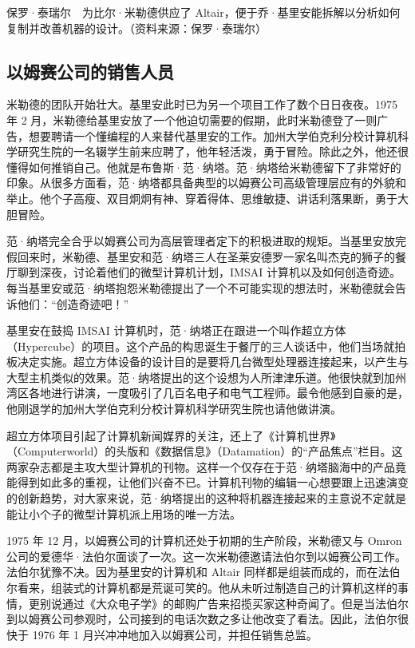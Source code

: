 \documentclass[12pt,UTF8]{ctexbook}
\begin{document}
保罗·泰瑞尔　为比尔·米勒德供应了 Altair，便于乔·基里安能拆解以分析如何复制并改善机器的设计。（资料来源：保罗·泰瑞尔）





\subsection{以姆赛公司的销售人员}


米勒德的团队开始壮大。基里安此时已为另一个项目工作了数个日日夜夜。1975 年 2 月，米勒德给基里安放了一个他迫切需要的假期，此时米勒德登了一则广告，想要聘请一个懂编程的人来替代基里安的工作。加州大学伯克利分校计算机科学研究生院的一名辍学生前来应聘了，他年轻活泼，勇于冒险。除此之外，他还很懂得如何推销自己。他就是布鲁斯·范·纳塔。范·纳塔给米勒德留下了非常好的印象。从很多方面看，范·纳塔都具备典型的以姆赛公司高级管理层应有的外貌和举止。他个子高瘦、双目炯炯有神、穿着得体、思维敏捷、讲话利落果断，勇于大胆冒险。

范·纳塔完全合乎以姆赛公司为高层管理者定下的积极进取的规矩。当基里安放完假回来时，米勒德、基里安和范·纳塔三人在圣莱安德罗一家名叫杰克的狮子的餐厅聊到深夜，讨论着他们的微型计算机计划，IMSAI 计算机以及如何创造奇迹。每当基里安或范·纳塔抱怨米勒德提出了一个不可能实现的想法时，米勒德就会告诉他们：“创造奇迹吧！”

基里安在鼓捣 IMSAI 计算机时，范·纳塔正在跟进一个叫作超立方体（Hypercube）的项目。这个产品的构思诞生于餐厅的三人谈话中，他们当场就拍板决定实施。超立方体设备的设计目的是要将几台微型处理器连接起来，以产生与大型主机类似的效果。范·纳塔提出的这个设想为人所津津乐道。他很快就到加州湾区各地进行讲演，一度吸引了几百名电子和电气工程师。最令他感到自豪的是，他刚退学的加州大学伯克利分校计算机科学研究生院也请他做讲演。

超立方体项目引起了计算机新闻媒界的关注，还上了《计算机世界》（Computerworld）的头版和《数据信息》（Datamation）的“产品焦点”栏目。这两家杂志都是主攻大型计算机的刊物。这样一个仅存在于范·纳塔脑海中的产品竟能得到如此多的重视，让他们兴奋不已。计算机刊物的编辑一心想要跟上迅速演变的创新趋势，对大家来说，范·纳塔提出的这种将机器连接起来的主意说不定就是能让小个子的微型计算机派上用场的唯一方法。

1975 年 12 月，以姆赛公司的计算机还处于初期的生产阶段，米勒德又与 Omron 公司的爱德华·法伯尔面谈了一次。这一次米勒德邀请法伯尔到以姆赛公司工作。法伯尔犹豫不决。因为基里安的计算机和 Altair 同样都是组装而成的，而在法伯尔看来，组装式的计算机都是荒诞可笑的。他从未听过制造自己的计算机这样的事情，更别说通过《大众电子学》的邮购广告来招揽买家这种奇闻了。但是当法伯尔到以姆赛公司参观时，公司接到的电话次数之多让他改变了看法。因此，法伯尔很快于 1976 年 1 月兴冲冲地加入以姆赛公司，并担任销售总监。
\end{document}
